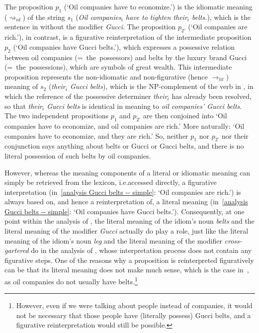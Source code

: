 \documentclass[output=paper]{langsci/langscibook}
\begin{document}
\noindent The proposition $p_{1}$ (`Oil companies have to economize.') is the idiomatic meaning ($\rightsquigarrow_{id}$) of the string $s_{1}$ (\textit{Oil companies$_{i}$ have to tighten their$_{i}$ belts.}), which is the sentence in  without the modifier \textit{Gucci}. The proposition $p_{2'}$ (`Oil companies are rich.'), in contrast, is a figurative reinterpretation of the intermediate proposition $p_{2}$ (`Oil companies have Gucci belts.'), which expresses a possessive relation between oil companies \mbox{(= the possessors)} and belts by the luxury brand Gucci \mbox{(= the possessions)}, which are symbols of great wealth. This intermediate proposition represents the non-idiomatic and non-figurative (hence $\rightarrow_{lit}$) meaning of $s_{2}$ (\textit{their$_{i}$ Gucci belts}), which is the NP-complement of the verb in , in which the reference of the possessive determiner \textit{their$_{i}$} has already been resolved, so that \textit{their$_{i}$ Gucci belts} is identical in meaning to \textit{oil companies' Gucci belts}. The two independent propositions $p_{1}$ and $p_{2'}$ are then conjoined into `Oil companies have to economize, and oil companies are rich.' More naturally: `Oil companies have to economize, and they are rich.' So, neither $p_{1}$ nor $p_{2'}$ nor their conjunction says anything about belts or Gucci or Gucci belts, and there is no literal possession of such belts by oil companies.

\begin{sloppypar}
  However, whereas the meaning components of a literal or idiomatic
  meaning can simply be retrieved from the lexicon, i.e.\@ accessed
  directly, a figurative interpretation (\mbox{in \ref{analysis Gucci
      belts -- simple}:} `Oil companies are rich.') is always based
  on, and hence a reinterpretation of, a literal meaning (\mbox{in
    \ref{analysis Gucci belts -- simple}:} `Oil companies have Gucci
  belts.'). Consequently, at one point within the analysis of
  , the literal meaning of the idiom's noun
  \textit{belts} and the literal meaning of the modifier
  \textit{Gucci} actually do play a role, just like the literal
  meaning of the idiom's noun \textit{leg} and the literal meaning of
  the modifier \textit{cross-gartered} do in the analysis of
  , whose interpretation process
  does not contain any figurative steps. One of the reasons why a
  propo\-sition is reinterpreted figuratively can be that its literal
  meaning does not make much sense, which is the case \mbox{in
    }, as oil companies do not
  usually have belts.\footnote{However, even if we were talking about
    people instead of companies, it would not be necessary that those
    people have (literally possess) Gucci belts, and a figurative
    reinterpretation would still be possible.}
\end{sloppypar}
\end{document}
